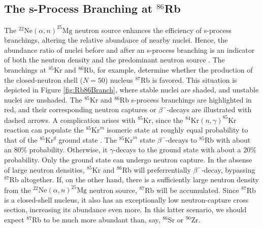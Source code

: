 \subsection{The s-Process Branching at $^{86}$Rb} \label{subsec:86Rb_Branch}

The $^{22}\mathrm{Ne}(\alpha,n)^{25}\mathrm{Mg}$ neutron source enhances the efficiency of s-process branchings, altering the relative abundance of nearby nuclei. Hence, the abundance ratio of nuclei before and after an s-process branching is an indicator of both the neutron density and the predominant neutron source \cite{Garcia2006}. The branchings at $^{85}$Kr and $^{86}$Rb, for example, determine whether the production of the closed-neutron shell ($N=50$) nucleus $^{87}$Rb is favored. This situation is depicted in Figure \ref{fig:Rb86Branch}, where stable nuclei are shaded, and unstable nuclei are unshaded. The $^{85}$Kr and $^{86}$Rb s-process branchings are highlighted in red, and their corresponding neutron captures or $\beta^{-}$-decays are illustrated with dashed arrows. A complication arises with $^{85}$Kr, since the $^{84}\mathrm{Kr}(n,\gamma)^{85}\mathrm{Kr}$ reaction can populate the $^{85}\mathrm{Kr}^{m}$ isomeric state at roughly equal probability to that of the $^{85}\mathrm{Kr}^{g}$ ground state \cite{Raut2013}. The $^{85}\mathrm{Kr}^{m}$ state $\beta^{-}$-decays to $^{85}$Rb with about an $80\%$ probability. Otherwise, it $\gamma$-decays to the ground state with about a $20\%$ probability. Only the ground state can undergo neutron capture. In the absense of large neutron densities, $^{85}$Kr and $^{86}$Rb will preferrentially $\beta^{-}$-decay, bypassing $^{87}$Rb altogether. If, on the other hand, there is a sufficiently large neutron density from the $^{22}\mathrm{Ne}(\alpha,n)^{25}\mathrm{Mg}$ neutron source, $^{87}$Rb will be accumulated. Since $^{87}$Rb is a closed-shell nucleus, it also has an exceptionally low neutron-capture cross section, increasing its abundance even more. In this latter scenario, we should expect $^{87}$Rb to be much more abundant than, say, $^{86}$Sr or $^{90}$Zr.

\newpage

\def\BoxSpace{0.3} %
\def\BoxSpacetwo{\BoxSpace * 2} %
\def\BoxSpacethree{\BoxSpace * 3}
\def\BoxSpacefour{\BoxSpace * 4}
\def\BoxSpacehalf{\BoxSpace * 0.5}
\def\AOS{0.1} %
\def\AW{0.52} %

